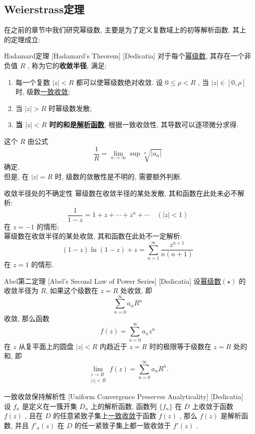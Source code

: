 \documentclass[UTF8]{ctexart}
\newcommand{\AnalyticalFunction}{\hyperref[dfn:AnalyticalFunction]{解析函数}}
\newcommand{\PowerSeries}{\hyperref[dfn:PowerSeries]{幂级数}}
\newcommand{\UniformConvergence}{\hyperref[dfn:UniformConvergence]{一致收敛}}
\begin{document}
\subsection{Weierstrass定理}
在之前的章节中我们研究幂级数, 主要是为了定义复数域上的初等解析函数. 其上的定理成立: 
\begin{thm}
    [UUID]
    {Hadamard定理}
    [Hadamard's Theorem]
    [Dedicatia]
    对于每个\PowerSeries , 其存在一个非负值 \( R \) , 称为它的\textbf{收敛半径}, 满足: 
    \begin{enumerate}
        \item 每一个复数 \( |z|<R \) 都可以使幂级数绝对收敛. 设 \( 0\leqslant\rho <R \) , 当 \( |z|\in[0,\rho] \) 时, 级数\UniformConvergence ; 
        \item 当 \( |z|>R \) 时幂级数发散; 
        \item \textbf{当 \( |z|<R \) 时的和是\AnalyticalFunction }, 根据一致收敛性, 其导数可以逐项微分求得. 
    \end{enumerate}
    这个 \( R \) 由公式
    \[\frac{1}{R}=\lim_{n\to \infty}\sup\sqrt[n]{|a_n|}\]
    确定. \\
    但是, 在 \( |z|=R \) 时, 级数的敛散性是不明的, 需要额外判断. 
\end{thm}
\begin{cxmp}
    {收敛半径处的不确定性}
    幂级数在收敛半径的某处发散, 其和函数在此处未必不解析: 
    \[\frac{1}{1-z}=1+z+\cdots+z^n+\cdots\quad(|z|<1) \]
    在 \( z=-1 \) 的情形; \\
    幂级数在收敛半径的某处收敛, 其和函数在此处不一定解析: 
    \[(1-z)\ln(1-z)+z=\sum_{n=1}^{\infty}\frac{z^{n+1}}{n(n+1)}\]
    在 \( z=1 \) 的情形. 
\end{cxmp}
\begin{thm}
    [UUID]
    {Abel第二定理}
    [Abel's Second Law of Power Series]
    [Dedicatia]
    设\PowerSeries  \( (\star) \) 的收敛半径为 \( R \), 如果这个级数在 \( z = R \) 处收敛, 即
    \[\sum_{n=0}^{\infty} a_n R^n\]
    收敛, 那么函数
    \[f(z) = \sum_{n=0}^{\infty} a_n z^n\]
    在 \( z \) 从复平面上的圆盘 \( |z| < R \) 内趋近于 \( z = R \) 时的极限等于级数在 \( z = R \) 处的和, 即
    \[\lim_{\substack{z \to R \\ |z| < R}} f(z) = \sum_{n=0}^{\infty} a_n R^n.\]
\end{thm}
\begin{thm}
    [UUID]
    {一致收敛保持解析性}
    [Uniform Convergence Preserves Analyticality]
    [Dedicatia]
    设 \( f_n \) 是定义在一簇开集 \( D_n \) 上的解析函数, 函数列 \( \{f_n\} \) 在 \( D \) 上收敛于函数 \( f(z) \) , 且在 \( D \) 的任意紧致子集上\UniformConvergence 于函数 \( f(z) \) , 那么 \( f(z) \) 是解析函数, 并且 \( f'_n(z) \) 在 \( D \) 的任一紧致子集上都一致收敛于 \( f'(z) \) .
\end{thm}
\end{document}
